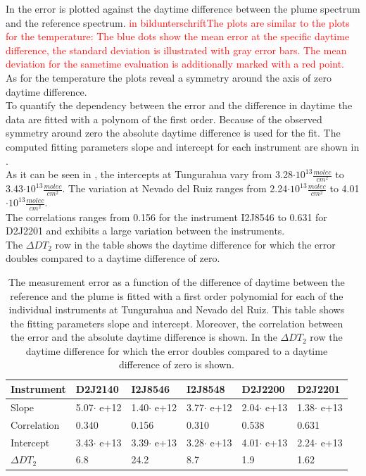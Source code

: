 In  the  error is plotted against the daytime difference between the plume spectrum and the reference spectrum. \textcolor{red}{in bildunterschriftThe plots are similar to the plots for the temperature: The blue dots show the mean  error at the specific daytime difference, the standard deviation is illustrated with gray error bars. The mean  deviation for the sametime evaluation is additionally marked with a red point.} \\
As for the temperature the plots reveal a symmetry around the axis of zero daytime difference.\\
%
To quantify the dependency between the  error and the difference in daytime the data are fitted with a polynom of the first order. Because of the observed symmetry around zero the absolute daytime difference is used for the fit. The computed fitting parameters slope and intercept for each instrument are shown in . \\
%
As it can be seen in , the intercepts at Tungurahua vary from 3.28$\cdot10^{13}\frac{molec}{cm^2}$ to 3.43$\cdot10^{13}\frac{molec}{cm^2}$. The variation at Nevado del Ruiz ranges from  2.24$\cdot10^{13}\frac{molec}{cm^2}$ to 4.01$\cdot10^{13}\frac{molec}{cm^2}$. \\
The correlations ranges from 0.156 for the instrument I2J8546 to  0.631 for D2J2201 and exhibits a large variation between the instruments.\\
The $\Delta DT_{2}$ row in the table shows the daytime difference for which the error doubles compared to a daytime difference of zero.
	\begin{table}[h]
	\centering
	\begin{tabular}{|p{2cm}|p{2.15cm}|p{2.15cm}|p{2.15cm}|p{2.15cm}|p{2.15cm}|}
		Instrument	&D2J2140&I2J8546& I2J8548&D2J2200&D2J2201\\
		\toprule
		Slope&5.07$\cdot$ e+12&1.40$\cdot$ e+12 &3.77$\cdot$ e+12 &2.04$\cdot$ e+13& 1.38$\cdot$ e+13\\
		\midrule
		Correlation&
		0.340&
		0.156&
		0.310&
		0.538&
		0.631\\
		\midrule
		Intercept& 3.43$\cdot$ e+13&3.39$\cdot$ e+13&3.28$\cdot$ e+13&  4.01$\cdot$ e+13&  2.24$\cdot$ e+13\\
		\midrule
		$\Delta DT_{2}$&6.8&24.2&8.7&1.9&1.62\\
		\bottomrule
	\end{tabular}
	\label{tab:dtcalc}
	\caption{The  measurement error as a function of the difference of daytime between the reference and the plume is fitted with a first order polynomial for each of the individual instruments at Tungurahua and Nevado del Ruiz. This table shows the fitting parameters slope and intercept. Moreover, the correlation between the  error and the absolute daytime difference is shown. In the $\Delta DT_{2}$ row the daytime difference for which the error doubles compared to a daytime difference of zero is shown.}
\end{table}

